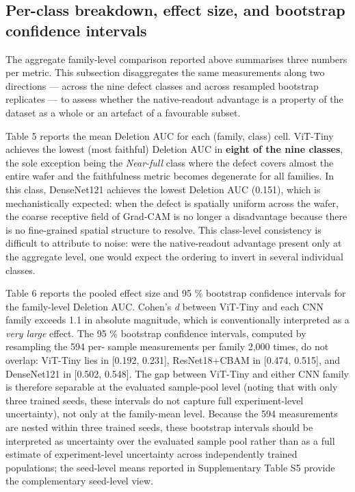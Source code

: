 \documentclass[11pt,a4paper]{article}
\begin{document}
\subsection{Per-class breakdown, effect size, and bootstrap confidence intervals}

The aggregate family-level comparison reported above summarises three numbers per metric. This subsection disaggregates the same measurements along two directions --- across the nine defect classes and across resampled bootstrap replicates --- to assess whether the native-readout advantage is a property of the dataset as a whole or an artefact of a favourable subset.

Table 5 reports the mean Deletion AUC for each (family, class) cell. ViT-Tiny achieves the lowest (most faithful) Deletion AUC in \textbf{eight of the nine classes}, the sole exception being the \emph{Near-full} class where the defect covers almost the entire wafer and the faithfulness metric becomes degenerate for all families. In this class, DenseNet121 achieves the lowest Deletion AUC (0.151), which is mechanistically expected: when the defect is spatially uniform across the wafer, the coarse receptive field of Grad-CAM is no longer a disadvantage because there is no fine-grained spatial structure to resolve. This class-level consistency is difficult to attribute to noise: were the native-readout advantage present only at the aggregate level, one would expect the ordering to invert in several individual classes.

Table 6 reports the pooled effect size and 95 \% bootstrap confidence intervals for the family-level Deletion AUC. Cohen's \emph{d} between ViT-Tiny and each CNN family exceeds 1.1 in absolute magnitude, which is conventionally interpreted as a \emph{very large} effect. The 95 \% bootstrap confidence intervals, computed by resampling the 594 per- sample measurements per family 2,000 times, do not overlap: ViT-Tiny lies in [0.192, 0.231], ResNet18+CBAM in [0.474, 0.515], and DenseNet121 in [0.502, 0.548]. The gap between ViT-Tiny and either CNN family is therefore separable at the evaluated sample-pool level (noting that with only three trained seeds, these intervals do not capture full experiment-level uncertainty), not only at the family-mean level. Because the 594 measurements are nested within three trained seeds, these bootstrap intervals should be interpreted as uncertainty over the
evaluated sample pool rather than as a full estimate of experiment-level uncertainty across independently trained populations; the seed-level means reported in Supplementary Table S5 provide the complementary seed-level view.
\end{document}
